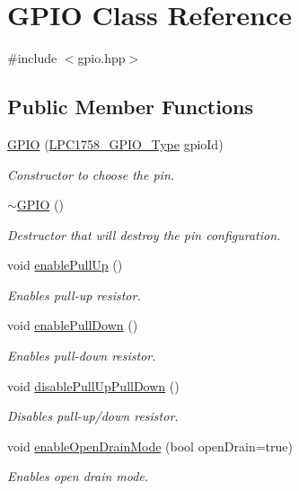\hypertarget{classGPIO}{}\section{G\+P\+IO Class Reference}
\label{classGPIO}


{\ttfamily \#include $<$gpio.\+hpp$>$}

\subsection*{Public Member Functions}
\begin{DoxyCompactItemize}
\item 
\hyperlink{classGPIO_acec0cdfbe71a5e4b4ed26c168c44dbc4}{G\+P\+IO} (\hyperlink{gpio_8hpp_a9e9814207938bb104144d2df58c554d8}{L\+P\+C1758\+\_\+\+G\+P\+I\+O\+\_\+\+Type} gpio\+Id)
\begin{DoxyCompactList}\small\item\em Constructor to choose the pin. \end{DoxyCompactList}\item 
\hyperlink{classGPIO_ae8205f95f108a15a612485b6358031a1}{$\sim$\+G\+P\+IO} ()
\begin{DoxyCompactList}\small\item\em Destructor that will destroy the pin configuration. \end{DoxyCompactList}\item 
void \hyperlink{classGPIO_a9ba7c2f50a449a7ca7f7e5f2680c4284}{enable\+Pull\+Up} ()
\begin{DoxyCompactList}\small\item\em Enables pull-\/up resistor. \end{DoxyCompactList}\item 
void \hyperlink{classGPIO_a9b2221a607da8a22adc5a0523148d5a7}{enable\+Pull\+Down} ()
\begin{DoxyCompactList}\small\item\em Enables pull-\/down resistor. \end{DoxyCompactList}\item 
void \hyperlink{classGPIO_aa2e401b63236bd2630b9a34372d590d3}{disable\+Pull\+Up\+Pull\+Down} ()
\begin{DoxyCompactList}\small\item\em Disables pull-\/up/down resistor. \end{DoxyCompactList}\item 
void \hyperlink{classGPIO_a04726c16f352186e0d7761006867ffb9}{enable\+Open\+Drain\+Mode} (bool open\+Drain=true)
\begin{DoxyCompactList}\small\item\em Enables open drain mode. \end{DoxyCompactList}\end{DoxyCompactItemize}
